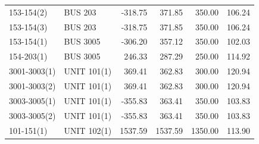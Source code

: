 \documentclass[10pt]{report}
\begin{document}
\begin{table}[H]
{\begin{tabular}{llrrrr}
153-154(2) & BUS 203 & -318.75 & 371.85 & 350.00 & 106.24 \\
153-154(3) & BUS 203 & -318.75 & 371.85 & 350.00 & 106.24 \\
153-154(1) & BUS 3005 & -306.20 & 357.12 & 350.00 & 102.03 \\
154-203(1) & BUS 3005 & 246.33 & 287.29 & 250.00 & 114.92 \\
3001-3003(1) & UNIT 101(1) & 369.41 & 362.83 & 300.00 & 120.94 \\
3001-3003(2) & UNIT 101(1) & 369.41 & 362.83 & 300.00 & 120.94 \\
3003-3005(1) & UNIT 101(1) & -355.83 & 363.41 & 350.00 & 103.83 \\
3003-3005(2) & UNIT 101(1) & -355.83 & 363.41 & 350.00 & 103.83 \\
101-151(1) & UNIT 102(1) & 1537.59 & 1537.59 & 1350.00 & 113.90 \\
\bottomrule
\end{tabular}}
\end{table}
\end{document}
